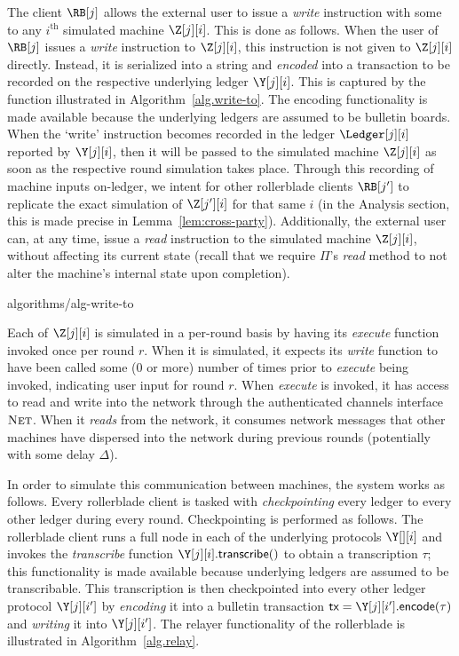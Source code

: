 The \rollerblade client $\RB[j]$ allows the external user to issue a \emph{write} instruction
with some \data
to any $i^\text{th}$ simulated machine $\Z[j][i]$. This is done as follows. When the user
of $\RB[j]$ issues a \emph{write} instruction to $\Z[j][i]$, this instruction is not given to
$\Z[j][i]$ directly. Instead, it is serialized into a string and \emph{encoded} into a transaction
to be recorded on the respective underlying ledger $\Y[j][i]$. This is captured by
the \writeToMachine function illustrated in Algorithm~\ref{alg.write-to}.
The encoding functionality is made available because
the underlying ledgers are assumed to be bulletin boards.
When the `write' instruction becomes recorded in the ledger $\Ledger[j][i]$ reported
by $\Y[j][i]$, then it will be passed to the simulated
machine $\Z[j][i]$ as soon as the respective round simulation takes place.
Through this recording of machine inputs on-ledger, we intent for other
rollerblade clients $\RB[j']$ to replicate the exact simulation of $\Z[j'][i]$ for that
same $i$ (in the Analysis section, this is made precise in Lemma~\ref{lem:cross-party}).
Additionally, the external user can, at any time, issue a \emph{read} instruction to
the simulated machine $\Z[j][i]$, without affecting its current state (recall that we
require $\Pi$'s \emph{read} method to not alter the machine's internal state upon completion).

{algorithms/alg-write-to}

Each of $\Z[j][i]$ is simulated in a per-round basis by having its \emph{execute}
function invoked once per round $r$. When it is simulated, it expects its \emph{write} function to have
been called some ($0$ or more) number of times prior to \emph{execute} being invoked,
indicating user input for round $r$. When \emph{execute} is invoked, it has access to read
and write into the network through the authenticated channels interface $\textsc{Net}$.
When it \emph{reads} from the network, it consumes network messages that other machines
have dispersed into the network during previous rounds (potentially with some delay $\Delta$).

In order to simulate this communication between machines, the system works as follows.
Every rollerblade client is tasked with \emph{checkpointing} every ledger to every other ledger
during every round. Checkpointing is performed as follows.
The rollerblade client runs a full node in each of the underlying protocols $\Y[][i]$ and
invokes the \emph{transcribe} function $\Y[j][i].\transcribe()$ to obtain a transcription
$\tau$; this functionality is made available because underlying ledgers are assumed to be
transcribable. This transcription is then checkpointed into every other ledger protocol
$\Y[j][i']$ by \emph{encoding} it into a bulletin transaction $\tx = \Y[j][i'].\encode(\tau)$
and \emph{writing} it into $\Y[j][i']$. The relayer functionality of the rollerblade
is illustrated in Algorithm~\ref{alg.relay}.

